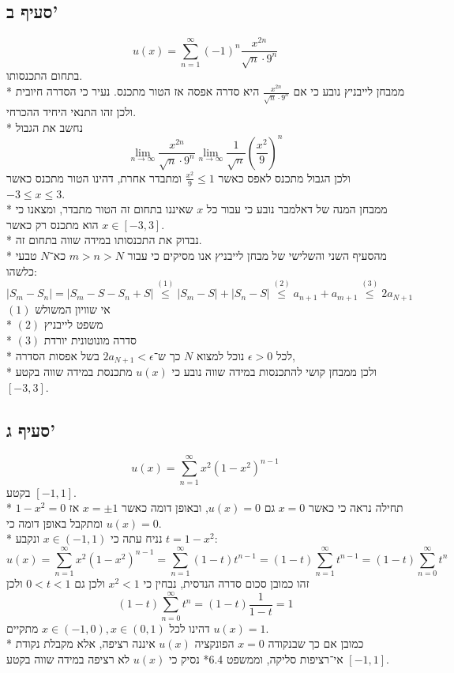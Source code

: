 \subsection{סעיף ב'}
\[
	u(x) = \sum_{n = 1}^{\infty} {(-1)}^n \frac{x^{2n}}{\sqrt{n} \cdot 9^n}
\]
בתחום התכנסותו. \\*
ממבחן לייבניץ נובע כי אם $\frac{x^{2n}}{\sqrt{n} \cdot 9^n}$ היא סדרה אפסה אז הטור מתכנס. נעיר כי הסדרה חיובית ולכן זהו התנאי היחיד ההכרחי. \\*
נחשב את הגבול
\[
	\lim_{n \to \infty} \frac{x^{2n}}{\sqrt{n} \cdot 9^n}
	\lim_{n \to \infty} \frac{1}{\sqrt{n}} {\left(\frac{x^2}{9}\right)}^n
\]
ולכן הגבול מתכנס לאפס כאשר $\frac{x^2}{9} \le 1$ ומתבדר אחרת, דהינו הטור מתכנס כאשר $-3 \le x \le 3$. \\*
ממבחן המנה של דאלמבר נובע כי עבור כל $x$ שאיננו בתחום זה הטור מתבדר, ומצאנו כי הוא מתכנס רק כאשר $x \in [-3, 3]$. \\*
נבדוק את התכנסותו במידה שווה בתחום זה. \\*
מהסעיף השני והשלישי של מבחן לייבניץ אנו מסיקים כי עבור $m > n > N$ כא־$N$ טבעי כלשהו:
\[
	\lvert S_m - S_n \rvert
	= \lvert S_m - S - S_n + S \rvert
	\overset{(1)}{\le} \lvert S_m - S \rvert + \lvert S_n - S \rvert
	\overset{(2)}{\le} a_{n + 1} + a_{m + 1}
	\overset{(3)}{\le} 2a_{N + 1}
\]
$(1)$ אי שוויון המשולש \\*
$(2)$ משפט לייבניץ \\*
$(3)$ סדרה מונוטונית יורדת \\*
לכל $\epsilon > 0$ נוכל למצוא $N$ כך ש־$2a_{N + 1} < \epsilon$ בשל אפסות הסדרה, \\*
ולכן ממבחן קושי להתכנסות במידה שווה נובע כי $u(x)$ מתכנסת במידה שווה בקטע $[-3, 3]$.

\subsection{סעיף ג'}
\[
	u(x) = \sum_{n = 1}^{\infty} x^2 {(1 - x^2)}^{n - 1}
\]
בקטע $[-1, 1]$. \\*
תחילה נראה כי כאשר $x = 0$ גם $u(x) = 0$, ובאופן דומה כאשר $x = \pm 1$ אז $1 - x^2 = 0$ ומתקבל באופן דומה כי $u(x) = 0$. \\*
נניח עתה כי $x \in (-1, 1)$ ונקבע $t = 1 - x^2$:
\[
	u(x)
	= \sum_{n = 1}^{\infty} x^2 {(1 - x^2)}^{n - 1}
	= \sum_{n = 1}^{\infty} (1 - t) t^{n - 1}
	= (1 - t) \sum_{n = 1}^{\infty} t^{n - 1}
	= (1 - t) \sum_{n = 0}^{\infty} t^n
\]
זהו כמובן סכום סדרה הנדסית, נבחין כי $x^2 < 1$ ולכן גם $0 < t < 1$ ולכן
\[
	(1 - t) \sum_{n = 0}^{\infty} t^n
	= (1 - t) \frac{1}{1 - t}
	= 1
\]
דהינו לכל $x \in (-1, 0), x \in (0, 1)$ מתקיים $u(x) = 1$. \\*
כמובן אם כך שבנקודה $x = 0$ הפונקציה $u(x)$ איננה רציפה, אלא מקבלת נקודת אי־רציפות סליקה,
וממשפט 6.4* נסיק כי $u(x)$ לא רציפה במידה שווה בקטע $[-1, 1]$.

